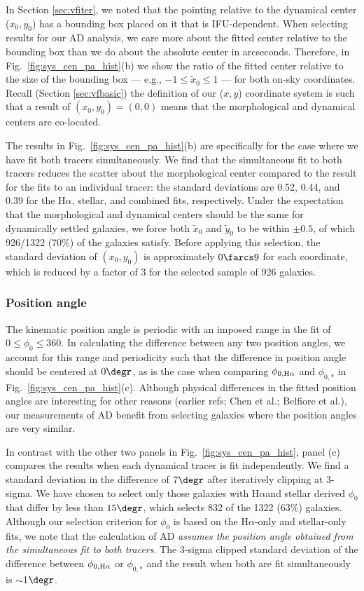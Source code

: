 \documentclass[apj,iop,revtex4,numberedappendix]{emulateapj}
\newcommand{\halpha}{H$\alpha$}
\begin{document}
In Section \ref{sec:vfiter}, we noted that the pointing relative to the
dynamical center ($x_0,y_0$) has a bounding box placed on it that is
IFU-dependent.  When selecting results for our AD analysis, we care more
about the fitted center relative to the bounding box than we do about
the absolute center in arcseconds.  Therefore, in
Fig.~\ref{fig:sys_cen_pa_hist}(b) we show the ratio of the fitted center
relative to the size of the bounding box --- e.g., $-1\leq \tilde{x}_0
\leq 1$ --- for both on-sky coordinates.  Recall (Section
\ref{sec:vfbasic}) the definition of our ($x,y$) coordinate system is
such that a result of $(x_0,y_0) = (0,0)$ means that the morphological
and dynamical centers are co-located.

The results in Fig.~\ref{fig:sys_cen_pa_hist}(b) are specifically for
the case where we have fit both tracers simultaneously.  We find that
the simultaneous fit to both tracers reduces the scatter about the
morphological center compared to the result for the fits to an
individual tracer: the standard deviations are 0.52, 0.44, and 0.39 for
the \halpha, stellar, and combined fits, respectively.  Under the
expectation that the morphological and dynamical centers should be the
same for dynamically settled galaxies, we force both $\tilde{x}_0$ and
$\tilde{y}_0$ to be within $\pm0.5$, of which 926/1322 (70\%) of the
galaxies satisfy.  Before applying this selection, the standard
deviation of $(x_0,y_0)$ is approximately $0\farcs9$ for each
coordinate, which is reduced by a factor of 3 for the selected sample of
926 galaxies.

\subsubsection{Position angle}

The kinematic position angle is periodic with an imposed range in the
fit of $0\leq\phi_0\leq360$.  In calculating the difference between any
two position angles, we account for this range and periodicity such that
the difference in position angle should be centered at $0\degr$, as is
the case when comparing $\phi_{0,{\rm H}\alpha}$ and $\phi_{0,\ast}$ in
Fig.~\ref{fig:sys_cen_pa_hist}(c).  Although physical differences in the
fitted position angles are interesting for other reasons (earlier refs;
Chen et al.; Belfiore et al.), our measurements of AD benefit from
selecting galaxies where the position angles are very similar.

In contrast with the other two panels in Fig.~\ref{fig:sys_cen_pa_hist},
panel (c) compares the results when each dynamical tracer is fit
independently.  We find a standard deviation in the difference of
$7\degr$ after iteratively clipping at 3-sigma.  We have chosen to
select only those galaxies with \halpha and stellar derived $\phi_0$ that
differ by less than $15\degr$, which selects 832 of the 1322 (63\%)
galaxies.  Although our selection criterion for $\phi_0$ is based on the
\halpha-only and stellar-only fits, we note that the calculation of AD
{\em assumes the position angle obtained from the simultaneous fit to
both tracers}.  The 3-sigma clipped standard deviation of the difference
between $\phi_{0,{\rm H}\alpha}$ or $\phi_{0,\ast}$ and the result when
both are fit simultaneously is $\sim$1$\degr$.
\end{document}
